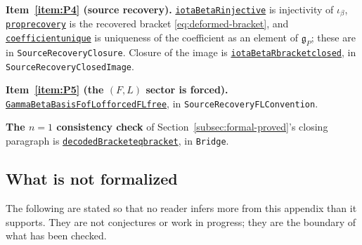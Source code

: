 \documentclass[11pt]{article}
\numberwithin{equation}{section}
\newcommand{\leanus}{\textunderscore\allowbreak}
\newcommand{\leandecl}[2]{\href{https://github.com/ritsumei-aoi/osp-triviality/blob/v2-lean-formalization/InhomogeneousDeformations/#1.lean}{\texttt{\let\_\leanus #2}}}
\theoremstyle{remark}
\begin{document}
\textbf{Item~\ref{item:P4} (source recovery).}
\leandecl{SourceRecoveryClosure}{iotaBetaR\_injective} is injectivity of
$\iota_\beta$, \leandecl{SourceRecoveryClosure}{prop\_recovery} is the
recovered bracket \eqref{eq:deformed-bracket}, and
\leandecl{SourceRecoveryClosure}{coefficient\_unique} is uniqueness of the
coefficient as an element of $\mathfrak g_P$; these are in
\texttt{SourceRecoveryClosure}. Closure of the image is
\leandecl{SourceRecoveryClosedImage}{iotaBetaR\_bracket\_closed}, in
\texttt{SourceRecoveryClosedImage}.

\textbf{Item~\ref{item:P5} (the $(F,L)$ sector is forced).}
\leandecl{SourceRecoveryFLConvention}{GammaBetaBasis\_Fof\_Lof\_forced\_FL\_free},
in \texttt{SourceRecoveryFLConvention}.

\textbf{The $n=1$ consistency check} of Section~\ref{subsec:formal-proved}'s
closing paragraph is \leandecl{Bridge}{decodedBracket\_eq\_bracket}, in
\texttt{Bridge}.

\endgroup

\subsection{What is not formalized}\label{subsec:not-formalized}

The following are stated so that no reader infers more from this appendix than it
supports. They are not conjectures or work in progress; they are the boundary of
what has been checked.
\end{document}
